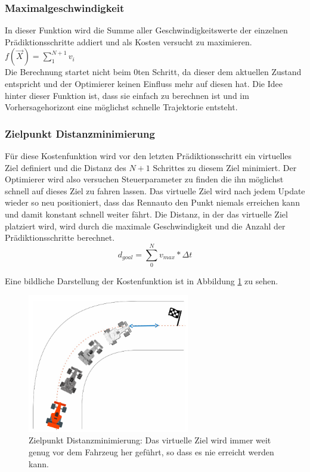\documentclass{like}
\begin{document}
\subsubsection*{Maximalgeschwindigkeit}  
In dieser Funktion wird die Summe aller Geschwindigkeitswerte der einzelnen Prädiktionsschritte addiert und als Kosten versucht zu maximieren. \\
$f(\vec{X}) =  \sum_{1}^{N+1} v_i$ \\
Die Berechnung startet nicht beim $0$ten Schritt, da dieser dem aktuellen Zustand entspricht und der Optimierer keinen Einfluss mehr auf diesen hat. Die Idee hinter dieser Funktion ist, dass sie einfach zu berechnen ist und im Vorhersagehorizont eine möglichst schnelle Trajektorie entsteht.

\subsubsection*{Zielpunkt Distanzminimierung}
Für diese Kostenfunktion wird vor den letzten Prädiktionsschritt ein virtuelles Ziel definiert und die Distanz des $N+1$ Schrittes zu diesem Ziel minimiert. Der Optimierer wird also versuchen Steuerparameter zu finden die ihn möglichst schnell auf dieses Ziel zu fahren lassen. Das virtuelle Ziel wird nach jedem Update wieder so neu positioniert, dass das Rennauto den Punkt niemals erreichen kann und damit konstant schnell weiter fährt. Die Distanz, in der das virtuelle Ziel platziert wird, wird durch die maximale Geschwindigkeit und die Anzahl der Prädiktionsschritte berechnet. 
\begin{equation}
	d_{goal} = \sum_{0}^{N}{v_{max} * \Delta t}
\end{equation}

Eine bildliche Darstellung der Kostenfunktion ist in Abbildung \ref{fig:costGoalDist} zu sehen. 

\begin{figure}[ht!]
	\centering
	\includegraphics[width=200pt]{Abbildungen/cost_goal_dist.png}
	\caption{Zielpunkt Distanzminimierung: Das virtuelle Ziel wird immer weit genug vor dem Fahrzeug her geführt, so dass es nie erreicht werden kann.}
	\label{fig:costGoalDist}
\end{figure}
\end{document}
